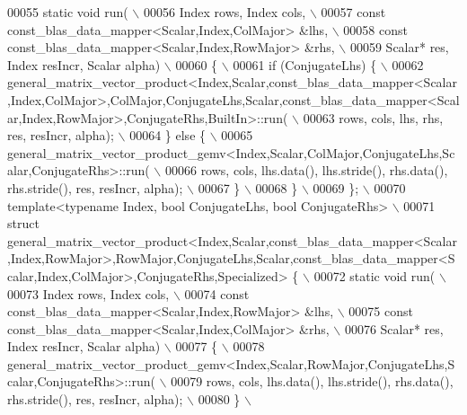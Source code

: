 \begin{DoxyCode}
00055 \textcolor{preprocessor}{static void run( \(\backslash\)}
00056 \textcolor{preprocessor}{  Index rows, Index cols, \(\backslash\)}
00057 \textcolor{preprocessor}{  const const\_blas\_data\_mapper<Scalar,Index,ColMajor> &lhs, \(\backslash\)}
00058 \textcolor{preprocessor}{  const const\_blas\_data\_mapper<Scalar,Index,RowMajor> &rhs, \(\backslash\)}
00059 \textcolor{preprocessor}{  Scalar* res, Index resIncr, Scalar alpha) \(\backslash\)}
00060 \textcolor{preprocessor}{\{ \(\backslash\)}
00061 \textcolor{preprocessor}{  if (ConjugateLhs) \{ \(\backslash\)}
00062 \textcolor{preprocessor}{   
       general\_matrix\_vector\_product<Index,Scalar,const\_blas\_data\_mapper<Scalar,Index,ColMajor>,ColMajor,ConjugateLhs,Scalar,const\_blas\_data\_mapper<Scalar,Index,RowMajor>,ConjugateRhs,BuiltIn>::run( \(\backslash\)}
00063 \textcolor{preprocessor}{      rows, cols, lhs, rhs, res, resIncr, alpha); \(\backslash\)}
00064 \textcolor{preprocessor}{  \} else \{ \(\backslash\)}
00065 \textcolor{preprocessor}{    general\_matrix\_vector\_product\_gemv<Index,Scalar,ColMajor,ConjugateLhs,Scalar,ConjugateRhs>::run( \(\backslash\)}
00066 \textcolor{preprocessor}{      rows, cols, lhs.data(), lhs.stride(), rhs.data(), rhs.stride(), res, resIncr, alpha); \(\backslash\)}
00067 \textcolor{preprocessor}{  \} \(\backslash\)}
00068 \textcolor{preprocessor}{\} \(\backslash\)}
00069 \textcolor{preprocessor}{\}; \(\backslash\)}
00070 \textcolor{preprocessor}{template<typename Index, bool ConjugateLhs, bool ConjugateRhs> \(\backslash\)}
00071 \textcolor{preprocessor}{struct
       general\_matrix\_vector\_product<Index,Scalar,const\_blas\_data\_mapper<Scalar,Index,RowMajor>,RowMajor,ConjugateLhs,Scalar,const\_blas\_data\_mapper<Scalar,Index,ColMajor>,ConjugateRhs,Specialized> \{ \(\backslash\)}
00072 \textcolor{preprocessor}{static void run( \(\backslash\)}
00073 \textcolor{preprocessor}{  Index rows, Index cols, \(\backslash\)}
00074 \textcolor{preprocessor}{  const const\_blas\_data\_mapper<Scalar,Index,RowMajor> &lhs, \(\backslash\)}
00075 \textcolor{preprocessor}{  const const\_blas\_data\_mapper<Scalar,Index,ColMajor> &rhs, \(\backslash\)}
00076 \textcolor{preprocessor}{  Scalar* res, Index resIncr, Scalar alpha) \(\backslash\)}
00077 \textcolor{preprocessor}{\{ \(\backslash\)}
00078 \textcolor{preprocessor}{    general\_matrix\_vector\_product\_gemv<Index,Scalar,RowMajor,ConjugateLhs,Scalar,ConjugateRhs>::run( \(\backslash\)}
00079 \textcolor{preprocessor}{      rows, cols, lhs.data(), lhs.stride(), rhs.data(), rhs.stride(), res, resIncr, alpha); \(\backslash\)}
00080 \textcolor{preprocessor}{\} \(\backslash\)}

\end{DoxyCode}
